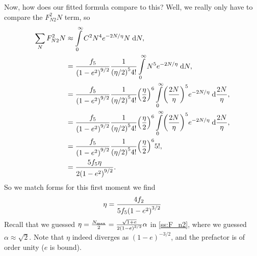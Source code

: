 \documentclass[11pt,
        usenames, %
        dvipsnames %
    ]{article}
\DeclarePairedDelimiter\p{\lparen}{\rparen}
\begin{document}
Now, how does our fitted formula compare to this? Well, we really only have to
compare the $F_{N2}^2N$ term, so
\begin{align}
    \sum\limits_{N}F_{N2}^2N &\approx \int\limits_0^\infty
            C^2 N^4 e^{-2N/\eta}N\;\mathrm{d}N,\\
        &= \frac{f_5}{\p*{1 - e^2}^{9/2}}
                \frac{1}{\p*{\eta / 2}^5 4!}
            \int\limits_0^\infty N^5 e^{-2N/\eta}\;\mathrm{d}N,\\
        &= \frac{f_5}{\p*{1 - e^2}^{9/2}}
                \frac{1}{\p*{\eta / 2}^5 4!}
            \p*{\frac{\eta}{2}}^6
            \int\limits_0^\infty \p*{\frac{2N}{\eta}}^5
                e^{-2N/\eta}\;\mathrm{d}\frac{2N}{\eta},\\
        &= \frac{f_5}{\p*{1 - e^2}^{9/2}}
                \frac{1}{\p*{\eta / 2}^5 4!}
            \p*{\frac{\eta}{2}}^6
            \int\limits_0^\infty \p*{\frac{2N}{\eta}}^5
                e^{-2N/\eta}\;\mathrm{d}\frac{2N}{\eta},\\
        &= \frac{f_5}{\p*{1 - e^2}^{9/2}}
                \frac{1}{\p*{\eta / 2}^5 4!}
            \p*{\frac{\eta}{2}}^6 5!,\\
        &= \frac{5f_5 \eta}{2\p*{1 - e^2}^{9/2}}.
\end{align}
So we match forms for this first moment we find
\begin{equation}
    \eta = \frac{4f_2}{5f_5\p*{1 - e^2}^{3/2}}
\end{equation}
Recall that we guessed $\eta = \frac{N_{\max}}{2} = \frac{\sqrt{1 + e}}{2\p*{1 -
e}^{3/2}}\alpha$ in \autoref{ss:F_n2}, where we guessed $\alpha \approx
\sqrt{2}$. Note that $\eta$ indeed diverges as $(1 - e)^{-3/2}$, and the
prefactor is of order unity ($e$ is bound).

\end{document}
